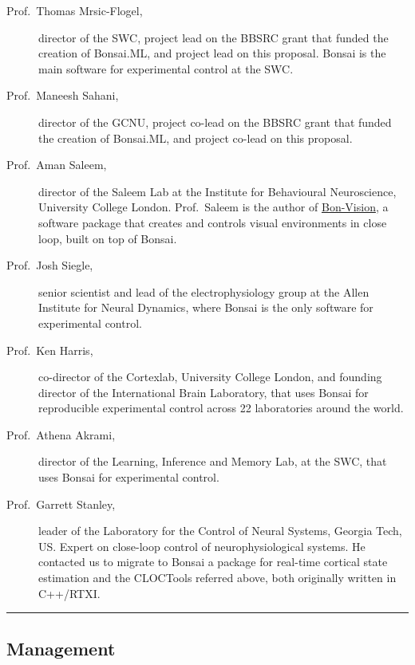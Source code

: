 \begin{description}

    \item[Prof.~Thomas Mrsic-Flogel,] director of the SWC, project lead on the
        BBSRC grant that funded the creation of Bonsai.ML, and project lead on
        this proposal. Bonsai is the main software for experimental control at
        the SWC.

    \item[Prof.~Maneesh Sahani,] director of the GCNU, project co-lead on the
        BBSRC grant that funded the creation of Bonsai.ML, and project co-lead
        on this proposal.

    \item[Prof.~Aman Saleem,] director of the Saleem Lab at the Institute for
        Behavioural Neuroscience, University College London. Prof.~Saleem is the
        author of \href{https://bonvision.github.io/}{Bon-Vision}, a software
        package that creates and controls visual environments in close loop,
        built on top of Bonsai.

    \item[Prof.~Josh Siegle,] senior scientist and lead of the
        electrophysiology group at the Allen Institute for Neural Dynamics,
        where Bonsai is the only software for experimental control.

    \item[Prof.~Ken Harris,] co-director of the Cortexlab, University College
        London, and founding director of the International Brain Laboratory,
        that uses Bonsai for reproducible experimental control across 22
        laboratories around the world.

    \item[Prof.~Athena Akrami,] director of the Learning, Inference and Memory
        Lab, at the SWC, that uses Bonsai for experimental control.

    \item[Prof.~Garrett Stanley,] leader of the Laboratory for the Control of
        Neural Systems, Georgia Tech, US. Expert on close-loop control of
        neurophysiological systems. He contacted us to migrate to Bonsai
        a package for real-time cortical state estimation and the CLOCTools
        referred above, both originally written in C++/RTXI.

\end{description}

\noindent\rule{\textwidth}{1pt}
\subsection*{Management}

